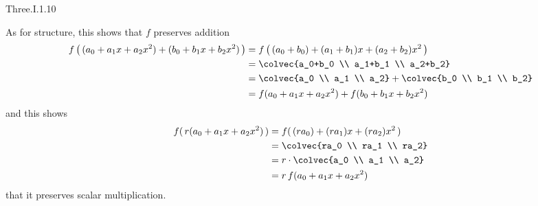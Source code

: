 \begin{ans}{Three.I.1.10}
\begin{exparts}
      As for structure,
      this shows that $f$ preserves addition
      \begin{align*}
        f\left(\,(a_0+a_1x+a_2x^2)+(b_0+b_1x+b_2x^2)\,\right)
        &=f\left(\,(a_0+b_0)+(a_1+b_1)x+(a_2+b_2)x^2\,\right)       \\
        &=\colvec{a_0+b_0 \\ a_1+b_1 \\ a_2+b_2}                    \\
        &=\colvec{a_0 \\ a_1 \\ a_2} +\colvec{b_0 \\ b_1 \\ b_2}   \\
        &=f(a_0+a_1x+a_2x^2)+f(b_0+b_1x+b_2x^2)
      \end{align*}
      and this shows
      \begin{align*}
        f(\,r(a_0+a_1x+a_2x^2)\,)
        &=f(\,(ra_0)+(ra_1)x+(ra_2)x^2\,)    \\
        &=\colvec{ra_0 \\ ra_1 \\ ra_2}     \\
        &=r\cdot\colvec{a_0 \\ a_1 \\ a_2}     \\
        &=r\,f(a_0+a_1x+a_2x^2)
      \end{align*}
      that it preserves scalar multiplication.
    \end{exparts}
   
\end{ans}
